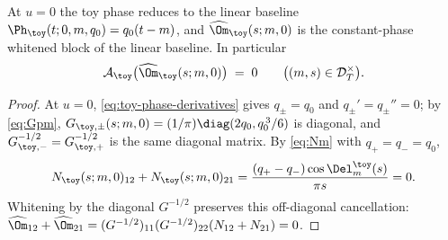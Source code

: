 \begin{lemma}
\label{lem:A-toy-baseline-vanishing}
At \(u=0\) the toy phase reduces to the linear baseline
\(\Ph_\toy(t;0,m,q_0)=q_0(t-m)\), and \(\widehat\Om_\toy(s;m,0)\) is
the constant-phase whitened block of the linear baseline.  In
particular
\begin{equation}
\label{eq:A-toy-baseline}
        \mathcal A_\toy\bigl(\widehat\Om_\toy(s;m,0)\bigr)\;=\;0
        \qquad\bigl((m,s)\in\mathcal D_T^\times\bigr).
\end{equation}
\end{lemma}

\begin{proof}
At \(u=0\), \eqref{eq:toy-phase-derivatives} gives \(q_\pm=q_0\) and
\(q_\pm'=q_\pm''=0\); by \eqref{eq:Gpm},
\(G_{\toy,\pm}(s;m,0)=(1/\pi)\diag(2q_0,q_0^{\,3}/6)\) is diagonal,
and \(G_{\toy,-}^{-1/2}=G_{\toy,+}^{-1/2}\) is the same diagonal
matrix.  By \eqref{eq:Nm} with \(q_+=q_-=q_0\),
\[
N_\toy(s;m,0)_{12}+N_\toy(s;m,0)_{21}
=\frac{(q_+-q_-)\cos\Del_m^\toy(s)}{\pi s}=0.
\]
Whitening by the diagonal \(G^{-1/2}\) preserves this off-diagonal
cancellation: \(\widehat\Om_{12}+\widehat\Om_{21}
=(G^{-1/2})_{11}(G^{-1/2})_{22}(N_{12}+N_{21})=0\).
\end{proof}


